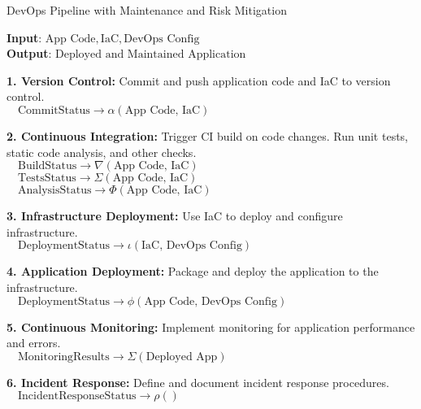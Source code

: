 \documentclass[12pt, letterpaper]{article}
\begin{document}
\begin{algorithm}[h!]
    \caption{DevOps Pipeline with Maintenance and Risk Mitigation}
    \label{alg:devops-pipeline}
    \scriptsize
    \textbf{Input}: \(\text{App Code}, \text{IaC}, \text{DevOps Config}\) \\
    \textbf{Output}: \(\text{Deployed and Maintained Application}\) \\
    \begin{algorithmic}[1]
        \State \textbf{1. Version Control:}
        \State \quad Commit and push application code and IaC to version control. \\
        $ \quad \text{CommitStatus} \xrightarrow{} \alpha(\text{App Code, IaC})$ 

        \State \textbf{2. Continuous Integration:}
        \State \quad Trigger CI build on code changes.
        \State \quad Run unit tests, static code analysis, and other checks. \\
        $ \quad \text{BuildStatus} \xrightarrow{} \nabla(\text{App Code, IaC})$  \\
        $ \quad \text{TestsStatus} \xrightarrow{} \Sigma(\text{App Code, IaC})$  \\
        $ \quad \text{AnalysisStatus} \xrightarrow{} \Phi(\text{App Code, IaC})$ 

        \State \textbf{3. Infrastructure Deployment:}
        \State \quad Use IaC to deploy and configure infrastructure. \\
        $ \quad \text{DeploymentStatus} \xrightarrow{} \iota(\text{IaC, DevOps Config})$ 

        \State \textbf{4. Application Deployment:}
        \State \quad Package and deploy the application to the infrastructure. \\
        $ \quad \text{DeploymentStatus} \xrightarrow{} \phi(\text{App Code, DevOps Config})$ 

        \State \textbf{5. Continuous Monitoring:}
        \State \quad Implement monitoring for application performance and errors. \\
        $ \quad \text{MonitoringResults} \xrightarrow{} \Sigma(\text{Deployed App})$ 

        \State \textbf{6. Incident Response:}
        \State \quad Define and document incident response procedures. \\
        $ \quad \text{IncidentResponseStatus} \xrightarrow{} \rho()$ 


\end{algorithmic}
\end{algorithm}
\end{document}
